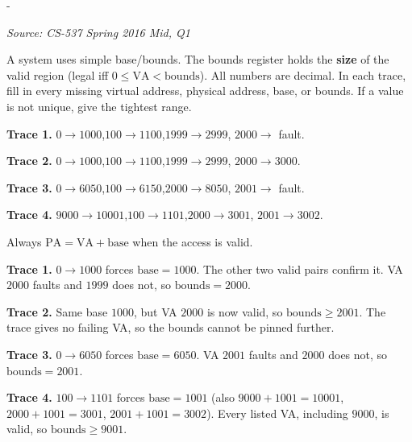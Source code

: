 \documentclass[11pt,a4paper]{article}
\makeatletter
\newcommand{\keepspace}[1]{\par\penalty-100\begingroup
  \setlength{\dimen@}{#1}\dimen@ii\pagegoal\advance\dimen@ii-\pagetotal
  \ifdim\dimen@>\dimen@ii\ifdim\dimen@ii>\z@\vfil\fi\break\fi\endgroup}
\newcounter{qn}[section]
\newenvironment{Qn}[4]{%
  \refstepcounter{qn}\keepspace{7\baselineskip}%
  \begin{tcolorbox}[qboxstyle, title={Q\thesection.\theqn\ \ [#1 \textbar\ #2]\ \ #4}]%
  {\footnotesize\color{g3}\textit{Source: #3}}\par\smallskip%
}{%
  \end{tcolorbox}%
}
\newenvironment{Sol}{%
  \begin{tcolorbox}[sboxstyle, title={Solution}]%
}{%
  \end{tcolorbox}\vspace{0.35em}%
}
\makeatother
\begin{document}
\begin{Qn}{Hard}{Lect 9}{CS-537 Spring 2016 Mid, Q1}{Base-and-bounds blues: fill in the missing VA / PA / registers}
A system uses simple base/bounds. The bounds register holds the
\textbf{size} of the valid region (legal iff $0\le\mathrm{VA}<\mathrm{bounds}$).
All numbers are decimal. In each trace, fill in every missing virtual
address, physical address, base, or bounds. If a value is not unique,
give the tightest range.

\textbf{Trace 1.}
$0\to 1000$,\quad $100\to 1100$,\quad $1999\to 2999$,\quad
$2000\to$ fault.

\textbf{Trace 2.}
$0\to 1000$,\quad $100\to 1100$,\quad $1999\to 2999$,\quad
$2000\to 3000$.

\textbf{Trace 3.}
$0\to 6050$,\quad $100\to 6150$,\quad $2000\to 8050$,\quad
$2001\to$ fault.

\textbf{Trace 4.}
$9000\to 10001$,\quad $100\to 1101$,\quad $2000\to 3001$,\quad
$2001\to 3002$.
\end{Qn}
\begin{Sol}
Always $\mathrm{PA}=\mathrm{VA}+\mathrm{base}$ when the access is valid.

\textbf{Trace 1.} $0\to 1000$ forces $\mathrm{base}=1000$. The other
two valid pairs confirm it. VA $2000$ faults and $1999$ does not, so
$\mathrm{bounds}=2000$.

\textbf{Trace 2.} Same base $1000$, but VA $2000$ is now valid, so
$\mathrm{bounds}\ge 2001$. The trace gives no failing VA, so the
bounds cannot be pinned further.

\textbf{Trace 3.} $0\to 6050$ forces $\mathrm{base}=6050$. VA $2001$
faults and $2000$ does not, so $\mathrm{bounds}=2001$.

\textbf{Trace 4.} $100\to 1101$ forces $\mathrm{base}=1001$ (also
$9000+1001=10001$, $2000+1001=3001$, $2001+1001=3002$). Every listed
VA, including $9000$, is valid, so $\mathrm{bounds}\ge 9001$.
\end{Sol}
\end{document}
